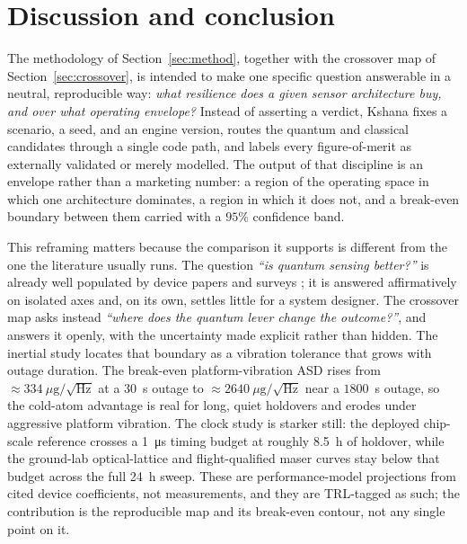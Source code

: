 \section{Discussion and conclusion}\label{sec:discussion}

The methodology of Section~\ref{sec:method}, together with the crossover map of
Section~\ref{sec:crossover}, is intended to make one specific question answerable in
a neutral, reproducible way: \emph{what resilience does a given sensor architecture
buy, and over what operating envelope?} Instead of asserting a verdict, Kshana
\citep{baweja2026kshana} fixes a scenario, a seed, and an engine version, routes the
quantum and classical candidates through a single code path, and labels every
figure-of-merit as externally validated or merely modelled. The output of that
discipline is an envelope rather than a marketing number: a region of the operating space
in which one architecture dominates, a region in which it does not, and a break-even
boundary between them carried with a $95\%$ confidence band.

This reframing matters because the comparison it supports is different from the one the
literature usually runs. The question \emph{``is quantum sensing better?''} is already
well populated by device papers and surveys
\citep{templier2022,coldatomnavreview2022,quantumpntreview2026}; it is answered
affirmatively on isolated axes and, on its own, settles little for a system designer.
The crossover map asks instead \emph{``where does the quantum lever change the
outcome?''}, and answers it openly, with the uncertainty made explicit rather than
hidden. The inertial study locates that boundary as a vibration tolerance that grows
with outage duration. The break-even platform-vibration ASD rises from
$\approx\!334~\mu\mathrm{g}/\sqrt{\mathrm{Hz}}$ at a $30$~s outage to
$\approx\!2640~\mu\mathrm{g}/\sqrt{\mathrm{Hz}}$ near a
$1800$~s outage, so the cold-atom advantage is real for long, quiet holdovers and
erodes under aggressive platform vibration. The clock study is starker still: the deployed chip-scale reference crosses a
\SI{1}{\micro\second} timing budget at roughly \SI{8.5}{\hour} of holdover, while
the ground-lab optical-lattice and flight-qualified maser curves stay below that budget
across the full \SI{24}{\hour} sweep. These are performance-model projections from cited device
coefficients, not measurements, and they are TRL-tagged as such; the contribution is the
reproducible map and its break-even contour, not any single point on it.

